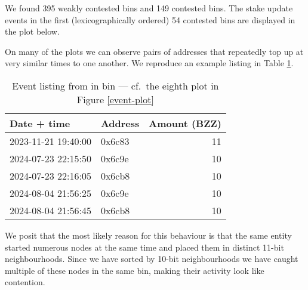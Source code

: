We found 395 weakly contested bins and 149 contested bins. 
%
The stake update events in the first (lexicographically ordered) 54 contested bins are displayed in the plot below.




On many of the plots we can observe pairs of addresses that repeatedly top up at very similar times to one another.
%
We reproduce an example listing in Table \ref{event-listing}.
%
\begin{table}
\begin{tabular}{llr}
Date + time         & Address & Amount (BZZ) \\
\hline
2023-11-21 19:40:00 & 0x6c83 &   11 \\
2024-07-23 22:15:50 &	0x6c9e  &	10 \\
2024-07-23 22:16:05 &	0x6cb8  &	10 \\
2024-08-04 21:56:25 &	0x6c9e  &	10 \\
2024-08-04 21:56:45 &	0x6cb8  &	10
\end{tabular}
\caption{Event listing from in bin  --- cf.~the eighth plot in Figure \ref{event-plot}}
\label{event-listing}
\end{table}
%
We posit that the most likely reason for this behaviour is that the same entity started numerous nodes at the same time and placed them in distinct 11-bit neighbourhoods.
%
Since we have sorted by 10-bit neighbourhoods we have caught multiple of these nodes in the same bin, making their activity look like contention.

